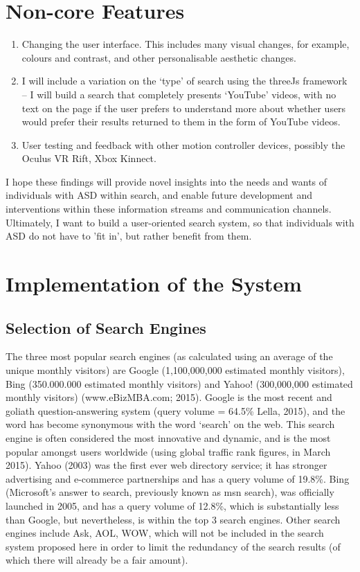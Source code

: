 \documentclass[11pt]{article}
\begin{document}
\section{Non-core Features}
\begin{enumerate}
\item Changing the user interface. This includes many visual changes, for example, colours and contrast, and other personalisable aesthetic changes.

\item	I will include a variation on the ‘type’ of search using the threeJs framework – I will build a search that completely presents ‘YouTube’ videos, with no text on the page if the user prefers to understand more about whether users would prefer their results returned to them in the form of YouTube videos.

\item	User testing and feedback with other motion controller devices, possibly the Oculus VR Rift, Xbox Kinnect.

\end{enumerate}
I hope these findings will provide novel insights into the needs and wants of individuals with ASD within search, and enable future development and interventions within these information streams and communication channels. Ultimately, I want to build a user-oriented search system, so that individuals with ASD do not have to 'fit in', but rather benefit from them.

\section{Implementation of the System}\label{implementation}
\subsection{Selection of Search Engines}
The three most popular search engines (as calculated using an average of the unique monthly visitors) are Google (1,100,000,000 estimated monthly visitors), Bing (350.000.000 estimated monthly visitors) and Yahoo! (300,000,000 estimated monthly visitors) (www.eBizMBA.com; 2015). Google is the most recent and goliath question-answering system (query volume = 64.5\% Lella, 2015), and the word has become synonymous with the word ‘search’ on the web. This search engine is often considered the most innovative and dynamic, and is the most popular amongst users worldwide (using global traffic rank figures, in March 2015). Yahoo (2003) was the first ever web directory service; it has stronger advertising and e-commerce partnerships and has a query volume of 19.8\%. Bing (Microsoft’s answer to search, previously known as msn search), was officially launched in 2005, and has a query volume of 12.8\%, which is substantially less than Google, but nevertheless, is within the top 3 search engines. Other search engines include Ask, AOL, WOW, which will not be included in the search system proposed here in order to limit the redundancy of the search results (of which there will already be a fair amount). 
\end{document}
